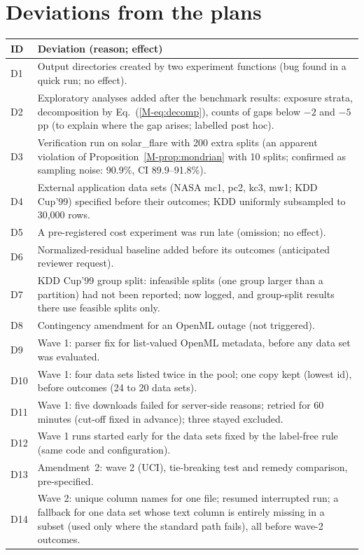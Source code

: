 \documentclass[11pt]{article}
\begin{document}
\section{Deviations from the plans}\label{sec:deviations}
\begin{longtable}{@{}p{0.7cm}p{15.2cm}@{}}
\toprule
ID & Deviation (reason; effect)\\
\midrule\endhead
D1 & Output directories created by two experiment functions (bug found in a quick run; no effect).\\
D2 & Exploratory analyses added after the benchmark results: exposure strata, decomposition by Eq.~(\ref{M-eq:decomp}), counts of gaps below $-2$ and $-5$\,pp (to explain where the gap arises; labelled post hoc).\\
D3 & Verification run on solar\_flare with 200 extra splits (an apparent violation of Proposition~\ref{M-prop:mondrian} with 10 splits; confirmed as sampling noise: 90.9\%, CI 89.9--91.8\%).\\
D4 & External application data sets (NASA mc1, pc2, kc3, mw1; KDD Cup'99) specified before their outcomes; KDD uniformly subsampled to 30,000 rows.\\
D5 & A pre-registered cost experiment was run late (omission; no effect).\\
D6 & Normalized-residual baseline added before its outcomes (anticipated reviewer request).\\
D7 & KDD Cup'99 group split: infeasible splits (one group larger than a partition) had not been reported; now logged, and group-split results there use feasible splits only.\\
D8 & Contingency amendment for an OpenML outage (not triggered).\\
D9 & Wave 1: parser fix for list-valued OpenML metadata, before any data set was evaluated.\\
D10 & Wave 1: four data sets listed twice in the pool; one copy kept (lowest id), before outcomes (24 to 20 data sets).\\
D11 & Wave 1: five downloads failed for server-side reasons; retried for 60 minutes (cut-off fixed in advance); three stayed excluded.\\
D12 & Wave 1 runs started early for the data sets fixed by the label-free rule (same code and configuration).\\
D13 & Amendment~2: wave 2 (UCI), tie-breaking test and remedy comparison, pre-specified.\\
D14 & Wave 2: unique column names for one file; resumed interrupted run; a fallback for one data set whose text column is entirely missing in a subset (used only where the standard path fails), all before wave-2 outcomes.\\

\end{longtable}
\end{document}
